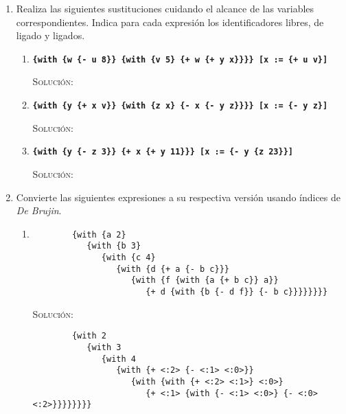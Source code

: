 \documentclass[letterpaper,11pt]{article}
\begin{document}
\begin{enumerate}
\begin{proof}
        \newpage
        Así, 
        \begin{center}
            \texttt{(length (ligada e)) $= 5 \not \leq 1$ (length (de-ligado e))}
        \end{center}

        Por lo tanto, la desigualdad \texttt{(length (ligada e)) $\leq$ 
        (length (de-ligado e))} es falsa.

    \end{proof}

    \item Realiza las siguientes sustituciones cuidando el alcance de las 
    variables correspondientes. Indica para cada expresión los identificadores 
    libres, de ligado y ligados. 
    \begin{enumerate}
        \item \texttt{\textbf{\{with \{w \{- u 8\}\} \{with \{v 5\} 
        \{+ w \{+ y x\}\}\}\} {[}x := \{+ u v\}{]}}}

        \textsc{Solución:}

        \item \texttt{\textbf{\{with \{y \{+ x v\}\} \{with \{z x\} 
        \{- x \{- y z\}\}\}\} [x := \{- y z\}]}}

        \textsc{Solución:}
        
        \item \texttt{\textbf{\{with \{y \{- z 3\}\} \{+ x \{+ y 11\}\}\} 
        [x := \{- y \{z 23\}\}]}}

        \textsc{Solución:}
    \end{enumerate}

    \item Convierte las siguientes expresiones a su respectiva versión usando
    índices de \textit{De Brujin}.
    \begin{enumerate}
        \item 
        \begin{verbatim}
        {with {a 2} 
           {with {b 3} 
              {with {c 4} 
                 {with {d {+ a {- b c}}} 
                    {with {f {with {a {+ b c}} a}} 
                       {+ d {with {b {- d f}} {- b c}}}}}}}}
        \end{verbatim}

        \textsc{Solución:}
        \begin{verbatim}
        {with 2 
           {with 3 
              {with 4
                 {with {+ <:2> {- <:1> <:0>}} 
                    {with {with {+ <:2> <:1>} <:0>} 
                       {+ <:1> {with {- <:1> <:0>} {- <:0> <:2>}}}}}}}}
        \end{verbatim}


\end{enumerate}
\end{enumerate}
\end{document}
